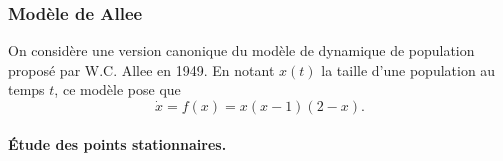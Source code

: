 \subsubsection{Modèle de Allee}


On considère une version canonique du modèle de dynamique de population proposé par W.C. Allee en 1949. En notant $x(t)$ la taille d'une population au temps $t$, ce modèle pose que 
\begin{equation} \label{eq:modAllee}
  \dot x = f(x) = x (x-1) (2-x).
\end{equation}

\bigskip 
\paragraph{\'Etude des points stationnaires.}
